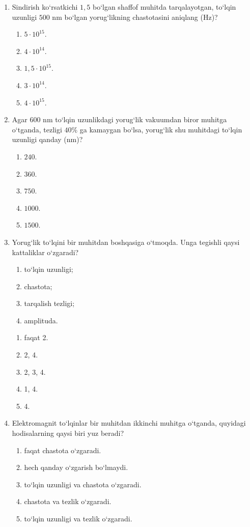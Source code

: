 \begin{enumerate}
\item Sindirish ko‘rsatkichi $1,5$ bo‘lgan shaffof muhitda tarqalayotgan, to‘lqin uzunligi $500$ nm bo‘lgan yorug‘likning chastotasini aniqlang (Hz)?
\begin{enumerate}[label=\Alph*)]
\item $5\cdot10^{15}$.
\item $4\cdot10^{14}$.
\item $1,5\cdot10^{15}$.
\item $3\cdot10^{14}$.
\item $4\cdot10^{15}$.
\end{enumerate}

\item Agar $600$ nm to‘lqin uzunlikdagi yorug‘lik vakuumdan biror muhitga o‘tganda, tezligi $40\%$ ga kamaygan bo‘lsa, yorug‘lik shu muhitdagi to‘lqin uzunligi qanday (nm)?
\begin{enumerate}[label=\Alph*)]
\item $240$.
\item $360$.
\item $750$.
\item $1000$.
\item $1500$.
\end{enumerate}

\item Yorug‘lik to‘lqini bir muhitdan boshqasiga o‘tmoqda. Unga tegishli qaysi kattaliklar o‘zgaradi?
\begin{enumerate}[label=\Alph*)]
\item to‘lqin uzunligi;
\item chastota;
\item tarqalish tezligi;
\item amplituda.
\end{enumerate}

\begin{enumerate}[label=\Alph*)]
\item faqat 2.
\item 2, 4.
\item 2, 3, 4.
\item 1, 4.
\item 4.
\end{enumerate}

\item Elektromagnit to‘lqinlar bir muhitdan ikkinchi muhitga o‘tganda, quyidagi hodisalarning qaysi biri yuz beradi?
\begin{enumerate}[label=\Alph*)]
\item faqat chastota o‘zgaradi.
\item hech qanday o‘zgarish bo‘lmaydi.
\item to‘lqin uzunligi va chastota o‘zgaradi.
\item chastota va tezlik o‘zgaradi.
\item to‘lqin uzunligi va tezlik o‘zgaradi.
\end{enumerate}


\end{enumerate}
